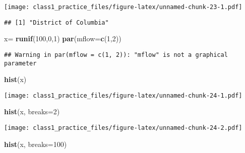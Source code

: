 \documentclass[
]{article}
\newenvironment{Shaded}{\begin{snugshade}}{\end{snugshade}}
\newcommand{\AttributeTok}[1]{\textcolor[rgb]{0.13,0.29,0.53}{#1}}
\newcommand{\DecValTok}[1]{\textcolor[rgb]{0.00,0.00,0.81}{#1}}
\newcommand{\FunctionTok}[1]{\textcolor[rgb]{0.13,0.29,0.53}{\textbf{#1}}}
\newcommand{\NormalTok}[1]{#1}
\newcommand{\OtherTok}[1]{\textcolor[rgb]{0.56,0.35,0.01}{#1}}
\newcommand{\SpecialCharTok}[1]{\textcolor[rgb]{0.81,0.36,0.00}{\textbf{#1}}}
\begin{document}
\texttt{[image: class1\_practice\_files/figure-latex/unnamed-chunk-23-1.pdf]}

\begin{Shaded}
\end{Shaded}

\begin{verbatim}
## [1] "District of Columbia"
\end{verbatim}

\begin{Shaded}
\begin{Highlighting}[]
\NormalTok{x}\OtherTok{=} \FunctionTok{runif}\NormalTok{(}\DecValTok{100}\NormalTok{,}\DecValTok{0}\NormalTok{,}\DecValTok{1}\NormalTok{)}
\FunctionTok{par}\NormalTok{(}\AttributeTok{mflow=}\FunctionTok{c}\NormalTok{(}\DecValTok{1}\NormalTok{,}\DecValTok{2}\NormalTok{))}
\end{Highlighting}
\end{Shaded}

\begin{verbatim}
## Warning in par(mflow = c(1, 2)): "mflow" is not a graphical parameter
\end{verbatim}

\begin{Shaded}
\begin{Highlighting}[]
\FunctionTok{hist}\NormalTok{(x)}
\end{Highlighting}
\end{Shaded}

\texttt{[image: class1\_practice\_files/figure-latex/unnamed-chunk-24-1.pdf]}

\begin{Shaded}
\begin{Highlighting}[]
\FunctionTok{hist}\NormalTok{(x, }\AttributeTok{breaks=}\DecValTok{2}\NormalTok{)}
\end{Highlighting}
\end{Shaded}

\texttt{[image: class1\_practice\_files/figure-latex/unnamed-chunk-24-2.pdf]}

\begin{Shaded}
\begin{Highlighting}[]
\FunctionTok{hist}\NormalTok{(x, }\AttributeTok{breaks=}\DecValTok{100}\NormalTok{)}
\end{Highlighting}
\end{Shaded}
\end{document}
